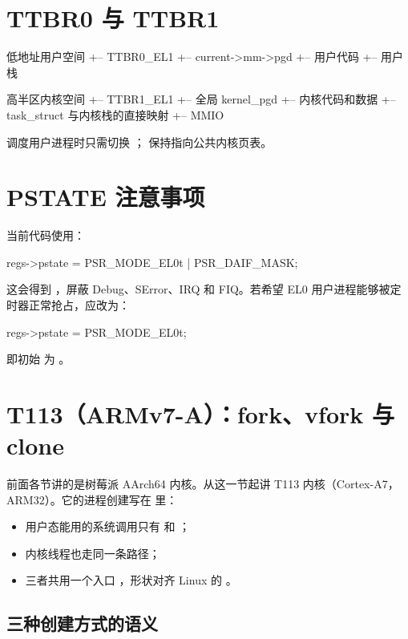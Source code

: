 \section{TTBR0 与 TTBR1}

\begin{txtcode}
低地址用户空间
+-- TTBR0_EL1
    +-- current->mm->pgd
        +-- 用户代码
        +-- 用户栈

高半区内核空间
+-- TTBR1_EL1
    +-- 全局 kernel_pgd
        +-- 内核代码和数据
        +-- task_struct 与内核栈的直接映射
        +-- MMIO
\end{txtcode}

调度用户进程时只需切换 ； 保持指向公共内核页表。

\section{PSTATE 注意事项}

当前代码使用：

\begin{ccode}
regs->pstate = PSR_MODE_EL0t | PSR_DAIF_MASK;
\end{ccode}

这会得到 ，屏蔽 Debug、SError、IRQ 和 FIQ。若希望 EL0 用户进程能够被定时器正常抢占，应改为：

\begin{ccode}
regs->pstate = PSR_MODE_EL0t;
\end{ccode}

即初始  为 。

\section{T113（ARMv7-A）：fork、vfork 与 clone}
\label{sec:t113-clone}

前面各节讲的是树莓派 AArch64 内核。从这一节起讲 T113 内核（Cortex-A7，ARM32）。它的进程创建写在  里：

\begin{itemize}
  \item 用户态能用的系统调用只有  和 ；
  \item 内核线程也走同一条路径；
  \item 三者共用一个入口 ，形状对齐 Linux 的 。
\end{itemize}

\subsection{三种创建方式的语义}

